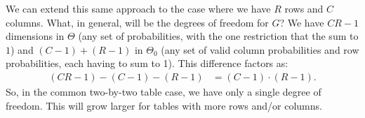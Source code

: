 \documentclass{tufte-handout}
\begin{document}
We can extend this same approach to the case where we have $R$ rows and
$C$ columns. What, in general, will be the degrees of freedom for $G$?
We have $CR-1$ dimensions in $\Theta$ (any set of probabilities, with 
the one restriction that the sum to $1$) and $(C-1) + (R-1)$ in $\Theta_0$
(any set of valid column probabilities and row probabilities, each having
to sum to 1). This difference factors as:
\begin{align*}
(CR-1) - (C-1) - (R-1) &= (C-1) \cdot (R-1).
\end{align*} 
So, in the common two-by-two table case, we have only a single degree of
freedom. This will grow larger for tables with more rows and/or columns.
\end{document}
